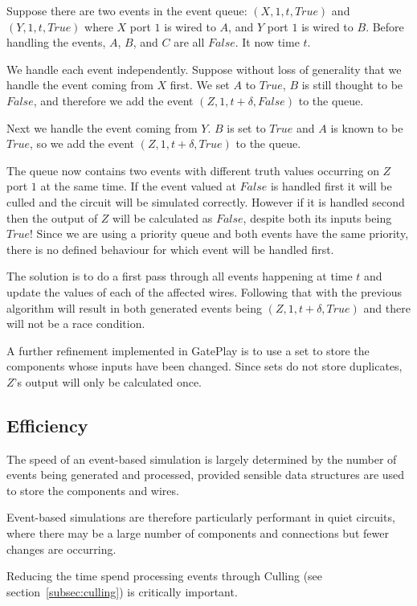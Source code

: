 Suppose there are two events in the event queue: $(X, 1, t, True)$ and $(Y, 1, t, True)$ where $X$ port $1$ is wired to $A$, and $Y$ port $1$ is wired to $B$. Before handling the events, $A$, $B$, and $C$ are all $False$. It now time $t$.

We handle each event independently. Suppose without loss of generality that we handle the event coming from $X$ first. We set $A$ to $True$, $B$ is still thought to be $False$, and therefore we add the event $(Z, 1, t + \delta, False)$ to the queue.

Next we handle the event coming from $Y$. $B$ is set to $True$ and $A$ is known to be $True$, so we add the event $(Z, 1, t + \delta, True)$ to the queue.

The queue now contains two events with different truth values occurring on $Z$ port $1$ at the same time. If the event valued at $False$ is handled first it will be culled and the circuit will be simulated correctly. However if it is handled second then the output of $Z$ will be calculated as $False$, despite both its inputs being $True$! Since we are using a priority queue and both events have the same priority, there is no defined behaviour for which event will be handled first.

The solution is to do a first pass through all events happening at time $t$ and update the values of each of the affected wires. Following that with the previous algorithm will result in both generated events being $(Z, 1, t + \delta, True)$ and there will not be a race condition.

A further refinement implemented in GatePlay is to use a set to store the components whose inputs have been changed. Since sets do not store duplicates, $Z$'s output will only be calculated once.

\subsection{Efficiency}
The speed of an event-based simulation is largely determined by the number of events being generated and processed, provided sensible data structures are used to store the components and wires.

Event-based simulations are therefore particularly performant in quiet circuits, where there may be a large number of components and connections but fewer changes are occurring.

Reducing the time spend processing events through Culling (see section~\ref{subsec:culling}) is critically important.

